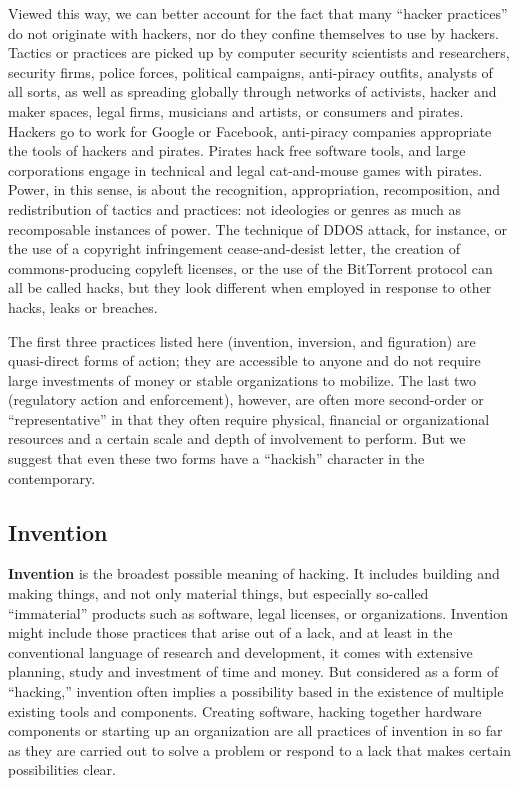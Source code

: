 \documentclass[10pt,letter,oneside]{scrartcl}
\begin{document}
Viewed this way, we can better account for the fact that many ``hacker
practices'' do not originate with hackers, nor do they confine themselves to use
by hackers.  Tactics or practices are picked up by computer security scientists
and researchers, security firms, police forces, political campaigns, anti-piracy
outfits, analysts of all sorts, as well as spreading globally through networks
of activists, hacker and maker spaces, legal firms, musicians and artists, or
consumers and pirates. Hackers go to work for Google or Facebook, anti-piracy
companies appropriate the tools of hackers and pirates.  Pirates hack free
software tools, and large corporations engage in technical and legal
cat-and-mouse games with pirates. Power, in this sense, is about the
recognition, appropriation, recomposition, and redistribution of tactics and
practices: not ideologies or genres as much as recomposable instances of power.  The
technique of DDOS attack, for instance, or the use of a copyright infringement
cease-and-desist letter, the creation of commons-producing copyleft licenses, or
the use of the BitTorrent protocol can all be called hacks, but they look
different when employed in response to other hacks, leaks or breaches.

The first three practices listed here (invention, inversion, and figuration) are
quasi-direct forms of action; they are accessible to anyone and do not require
large investments of money or stable organizations to mobilize.  The last two
(regulatory action and enforcement), however, are often more second-order or
``representative'' in that they often require physical, financial or
organizational resources and a certain scale and depth of involvement to
perform.  But we suggest that even these two forms have a ``hackish'' character
in the contemporary.

\subsection*{Invention}

\textbf{Invention} is the broadest possible meaning of hacking. It includes
building and making things, and not only material things, but especially
so-called ``immaterial'' products such as software, legal licenses, or
organizations.  Invention might include those practices that arise out of a
lack, and at least in the conventional language of research and development, it
comes with extensive planning, study and investment of time and money.  But
considered as a form of ``hacking,'' invention often implies a possibility based
in the existence of multiple existing tools and components.  Creating software,
hacking together hardware components or starting up an organization are all
practices of invention in so far as they are carried out to solve a problem or
respond to a lack that makes certain possibilities clear.
\end{document}
